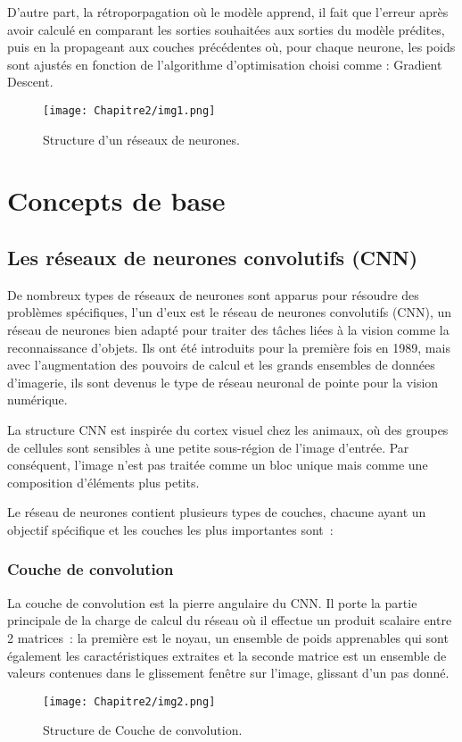 D'autre part, la rétroporpagation où le modèle apprend, il fait que l'erreur après avoir calculé en comparant les sorties souhaitées aux sorties du modèle prédites, puis en la propageant aux couches précédentes où, pour chaque neurone, les poids sont ajustés en fonction de l'algorithme d'optimisation choisi comme : Gradient Descent.
\begin{figure}[H]
     \centering
     \texttt{[image: Chapitre2/img1.png]}
     \caption{Structure d'un réseaux de neurones.}
     \label{img1}
     \end{figure}

\section{Concepts de base} 
     \subsection{Les réseaux de neurones convolutifs (CNN)} 
     De nombreux types de réseaux de neurones sont apparus pour résoudre des problèmes spécifiques, l'un d'eux est le réseau de neurones convolutifs (CNN), un réseau de neurones bien adapté pour traiter des tâches liées à la vision comme la reconnaissance d'objets. Ils ont été introduits pour la première fois en 1989, mais avec l'augmentation des pouvoirs de calcul et les grands ensembles de données d'imagerie, ils sont devenus le type de réseau neuronal de pointe pour la vision numérique.
     
     La structure CNN est inspirée du cortex visuel chez les animaux, où des groupes de cellules sont sensibles à une petite sous-région de l'image d'entrée. Par conséquent, l'image n'est pas traitée comme un bloc unique mais comme une composition d'éléments plus petits. \cite{db3}
     
     Le réseau de neurones contient plusieurs types de couches, chacune ayant un objectif spécifique et les couches les plus importantes sont :
     
     \subsubsection{Couche de convolution}   
     La couche de convolution est la pierre angulaire du CNN. Il porte la partie principale de la charge de calcul du réseau où il effectue un produit scalaire entre 2 matrices : la première est le noyau, un ensemble de poids apprenables qui sont également les caractéristiques extraites et la seconde matrice est un ensemble de valeurs contenues dans le glissement fenêtre sur l'image, glissant d'un pas donné.
     \begin{figure}[H]
          \centering
          \texttt{[image: Chapitre2/img2.png]}
          \caption{Structure de Couche de convolution.}
          \label{img2}
          \end{figure}
     
